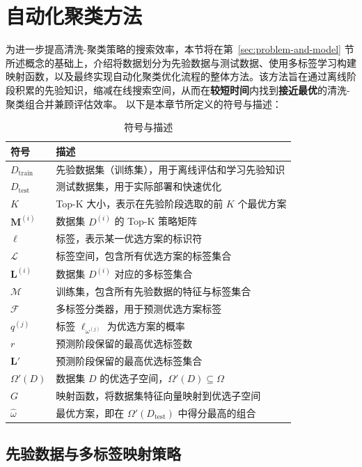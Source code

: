\documentclass[10pt]{article} %
\numberwithin{equation}{section}
\begin{document}
\section{自动化聚类方法}
\label{sec:autoML}

为进一步提高清洗-聚类策略的搜索效率，本节将在第~\ref{sec:problem-and-model} 节所述概念的基础上，介绍将数据划分为先验数据与测试数据、使用多标签学习构建映射函数，以及最终实现自动化聚类优化流程的整体方法。该方法旨在通过离线阶段积累的先验知识，缩减在线搜索空间，从而在\textbf{较短时间}内找到\textbf{接近最优}的清洗-聚类组合并兼顾评估效率。
以下是本章节所定义的符号与描述：

\begin{table}[ht]
\centering
\caption{符号与描述}
\label{tab:symbols-advanced}
\begin{tabular}{ll}
\toprule
\textbf{符号} & \textbf{描述} \\
\midrule
$D_{\text{train}}$ & 先验数据集（训练集），用于离线评估和学习先验知识 \\
$D_{\text{test}}$ & 测试数据集，用于实际部署和快速优化 \\
$K$ & Top-K 大小，表示在先验阶段选取的前 $K$ 个最优方案 \\
$\mathbf{M}^{(i)}$ & 数据集 $D^{(i)}$ 的 Top-K 策略矩阵 \\
$\ell$ & 标签，表示某一优选方案的标识符 \\
$\mathcal{L}$ & 标签空间，包含所有优选方案的标签集合 \\
$\mathbf{L}^{(i)}$ & 数据集 $D^{(i)}$ 对应的多标签集合 \\
$\mathcal{M}$ & 训练集，包含所有先验数据的特征与标签集合 \\
$\mathcal{F}$ & 多标签分类器，用于预测优选方案标签 \\
$q^{(j)}$ & 标签 $\ell_{\omega^{(j)}}$ 为优选方案的概率 \\
$r$ & 预测阶段保留的最高优选标签数 \\
$\mathbf{L}'$ & 预测阶段保留的最高优选标签集合 \\
$\Omega'(D)$ & 数据集 $D$ 的优选子空间，$\Omega'(D) \subseteq \Omega$ \\
$G$ & 映射函数，将数据集特征向量映射到优选子空间 \\
$\hat{\omega}$ & 最优方案，即在 $\Omega'(D_{\text{test}})$ 中得分最高的组合 \\
\bottomrule
\end{tabular}
\end{table}
\subsection{先验数据与多标签映射策略}
\label{sec:prior-data-mapping}
\end{document}
